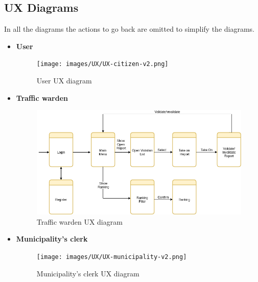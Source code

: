 \documentclass{article}
\begin{document}
\clearpage
\subsection{UX Diagrams}
In all the diagrams the actions to go back are omitted to simplify the diagrams.
\begin{itemize} 
	\item \bf User
		\begin{figure}[!htb]
			\centering
			\texttt{[image: images/UX/UX-citizen-v2.png]}
			\caption{User UX diagram}
		\end{figure}

	\item \bf Traffic warden
		\begin{figure}[!htb]
			\centering
			\includegraphics[width=1.0\textwidth]{images/UX/UX-traffic-warden-v2.png}
			\caption{Traffic warden UX diagram}
		\end{figure}
\newpage
	\item \bf Municipality's clerk
		\begin{figure}[!htb]
			\centering
			\texttt{[image: images/UX/UX-municipality-v2.png]}
			\caption{Municipality's clerk UX diagram}
		\end{figure}
\end{itemize} 

\newpage
\end{document}
